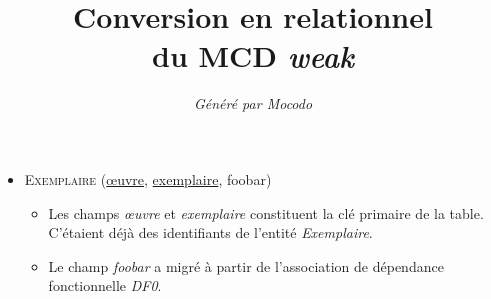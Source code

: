 \documentclass[a4paper]{article}
\title{Conversion en relationnel\\du MCD \emph{weak}}
\author{\emph{Généré par Mocodo}}
\newcommand{\relat}[1]{\textsc{#1}}
\newcommand{\attr}[1]{#1}
\newcommand{\prim}[1]{\uline{#1}}
\begin{document}
\maketitle

\begin{itemize}
  \item \relat{Exemplaire} (\prim{œuvre}, \prim{exemplaire}, \attr{foobar})
  \begin{itemize}
    \item Les champs \emph{œuvre} et \emph{exemplaire} constituent la clé primaire de la table. C'étaient déjà des identifiants de l'entité \emph{Exemplaire}.
    \item Le champ \emph{foobar} a migré à partir de l'association de dépendance fonctionnelle \emph{DF0}.
  \end{itemize}

\end{itemize}
\end{document}

